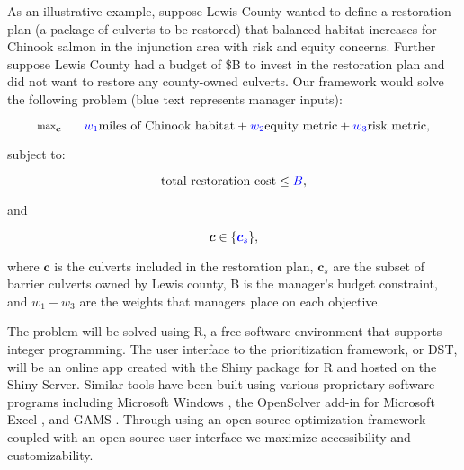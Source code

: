 \documentclass[12pt]{elsarticle}
\begin{document}
As an illustrative example, suppose Lewis County wanted to define a restoration plan (a package of culverts to be restored) that balanced habitat increases for Chinook salmon in the injunction area with risk and equity concerns. Further suppose Lewis County had a budget of \$B to invest in the restoration plan and did not want to restore any county-owned culverts. Our framework would solve the following problem (blue text represents manager inputs):

\begin{equation*}
\substack{\text{max}}_{\boldsymbol{c}}\hspace{0.25in} \textcolor{blue}{w_1} \text{miles of Chinook habitat} + \textcolor{blue}{w_2} \text{equity metric} + \textcolor{blue}{w_3} \text{risk metric},
\end{equation*}

\noindent subject to:

\begin{equation*}
\text{total restoration cost} \le \textcolor{blue}{B},
\end{equation*}

\noindent and

\begin{equation*}
\boldsymbol{c} \in \{\textcolor{blue}{\boldsymbol{c}_s}  \},
\end{equation*}

where $\boldsymbol{c}$ is the culverts included in the restoration plan, $\boldsymbol{c}_s$ are the subset of barrier culverts owned by Lewis county, B is the manager's budget constraint, and $w_1-w_3$ are the weights that managers place on each objective. 

The problem will be solved using R, a free software environment that supports integer programming. The user interface to the prioritization framework, or DST, will be an online app created with the Shiny package for R and hosted on the Shiny Server. Similar tools have been built using various proprietary software programs including Microsoft Windows \citep{optipass2015migratory}, the OpenSolver add-in for Microsoft Excel \citep{mcmanamay2019commonalities}, and GAMS \citep{moody2017pet}. Through using an open-source optimization framework coupled with an open-source user interface we maximize accessibility and customizability.  
\end{document}
